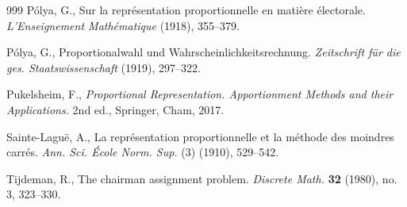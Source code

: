 \documentclass[11pt,reqno,tbtags,a4paper]{amsart}
\numberwithin{equation}{section}
\theoremstyle{plain}%
\theoremstyle{definition}
\theoremstyle{remark}
\newcommand\0{{\boldsymbol 0}}
\newcommand\1{{\boldsymbol 1}}
\begin{document}
\begin{thebibliography}{999}
Pólya, G.,
Sur la représentation proportionnelle en matière électorale. 
\emph{L'Enseignement Mathématique}  (1918), 355--379. 

Pólya, G., 
Proportionalwahl und Wahrscheinlichkeitsrechnung. 
\emph{Zeitschrift für die ges. Staatswissenschaft} 
 (1919), 297--322.

Pukelsheim, F.,
\emph{Proportional Representation. Apportionment Methods and their
Applications.} 
2nd ed., Springer, Cham, 2017. 

Sainte-Lagu\"e, A.,
La repr\'esentation proportionnelle et la m\'ethode des moindres carr\'es.  
\emph{Ann. Sci. \'Ecole Norm. Sup.} (3)  (1910), 529--542.

Tijdeman, R.,
The chairman assignment problem.
\emph{Discrete Math.} \textbf{32} (1980), no. 3, 323--330.

\end{thebibliography}
\end{document}
